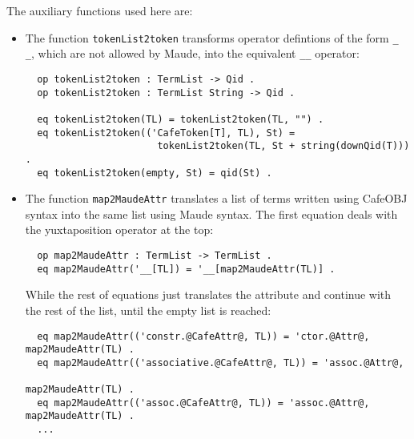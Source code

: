 The auxiliary functions used here are:
\begin{itemize}

\item
The function \verb"tokenList2token" transforms operator defintions of the
form \verb"_ _", which are not allowed by Maude, into the equivalent \verb"__"
operator:

{\codesize
\begin{verbatim}
  op tokenList2token : TermList -> Qid .
  op tokenList2token : TermList String -> Qid .

  eq tokenList2token(TL) = tokenList2token(TL, "") .
  eq tokenList2token(('CafeToken[T], TL), St) =
                       tokenList2token(TL, St + string(downQid(T))) .
  eq tokenList2token(empty, St) = qid(St) .
\end{verbatim}
}

\item
The function \verb"map2MaudeAttr" translates a list of terms written using CafeOBJ
syntax into the same list using Maude syntax. The first equation deals with the
yuxtaposition operator at the top:

{\codesize
\begin{verbatim}
  op map2MaudeAttr : TermList -> TermList .
  eq map2MaudeAttr('__[TL]) = '__[map2MaudeAttr(TL)] .
\end{verbatim}
}

While the rest of equations just translates the attribute and continue with the rest
of the list, until the empty list is reached:

{\codesize
\begin{verbatim}
  eq map2MaudeAttr(('constr.@CafeAttr@, TL)) = 'ctor.@Attr@, map2MaudeAttr(TL) .
  eq map2MaudeAttr(('associative.@CafeAttr@, TL)) = 'assoc.@Attr@,
                                                    map2MaudeAttr(TL) .
  eq map2MaudeAttr(('assoc.@CafeAttr@, TL)) = 'assoc.@Attr@, map2MaudeAttr(TL) .
  ...
\end{verbatim}
}

{\codesize
\begin{comment}
  eq map2MaudeAttr(('l-assoc.@CafeAttr@, TL)) =
               'gather`(_`)['neTokenList['__[''E.Sort,''e.Sort]]], map2MaudeAttr(TL) .
  eq map2MaudeAttr(('r-assoc.@CafeAttr@, TL)) =
               'gather`(_`)['neTokenList['__[''e.Sort,''E.Sort]]], map2MaudeAttr(TL) .
  eq map2MaudeAttr(('commutative.@CafeAttr@, TL)) = 'comm.@Attr@, map2MaudeAttr(TL) .
  eq map2MaudeAttr(('comm.@CafeAttr@, TL)) = 'comm.@Attr@, map2MaudeAttr(TL) .
  eq map2MaudeAttr(('idempotent.@CafeAttr@, TL)) = 'idem.@Attr@, map2MaudeAttr(TL) .
  eq map2MaudeAttr(('idem.@CafeAttr@, TL)) = 'idem.@Attr@, map2MaudeAttr(TL) .
  eq map2MaudeAttr(('nonexec.@CafeAttr@, TL)) = 'nonexec.@Attr@, map2MaudeAttr(TL) .
  eq map2MaudeAttr(('id:`(_`)['CafeBubble[T]], TL)) = 'id:_['bubble[T]], map2MaudeAttr(TL) .
  eq map2MaudeAttr(('idr:`(_`)['CafeBubble[T]], TL)) = 'id:_['bubble[T]], map2MaudeAttr(TL) .
  eq map2MaudeAttr(('prec:_['CafeToken[T]], TL)) = 'prec_['token[T]], map2MaudeAttr(TL) .
  eq map2MaudeAttr(('metadata['CafeToken[T]], TL)) = 'metadata_['token[T]], map2MaudeAttr(TL) .
\end{comment}
}


\end{itemize}
